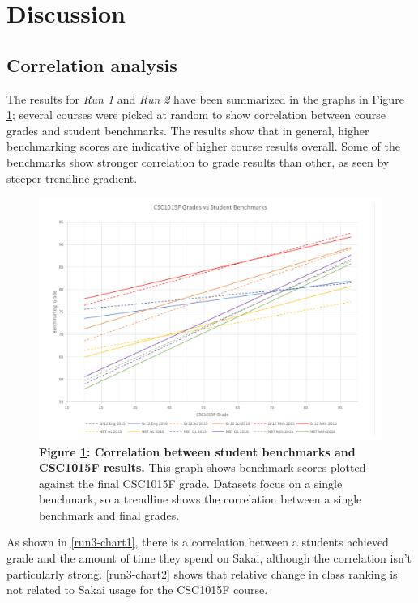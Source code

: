 \section{Discussion}

\subsection*{Correlation analysis}
The results for \textit{Run 1} and \textit{Run 2} have been summarized in the graphs in Figure \ref{run1-chart1}; several courses were picked at random to show correlation between course grades and student benchmarks. The results show that in general, higher benchmarking scores are indicative of higher course results overall. Some of the benchmarks show stronger correlation to grade results than other, as seen by steeper trendline gradient.

\begin{figure}[H]
    \centering
    \begin{mdframed}
        \centering
        \includegraphics[scale=0.55]{./resources/figures/run1-chart1.png}
    \end{mdframed}
    \caption[CSC1015 grade vs benchmark correlation]{\textbf{Figure \ref{run1-chart1}: Correlation between student benchmarks and CSC1015F results.} This graph shows benchmark scores plotted against the final CSC1015F grade. Datasets focus on a single benchmark, so a trendline shows the correlation between a single benchmark and final grades.}
    \label{run1-chart1}
\end{figure}


As shown in \ref{run3-chart1}, there is a correlation between a students achieved grade and the amount of time they spend on Sakai, although the correlation isn't particularly strong. \ref{run3-chart2} shows that relative change in class ranking is not related to Sakai usage for the CSC1015F course.

